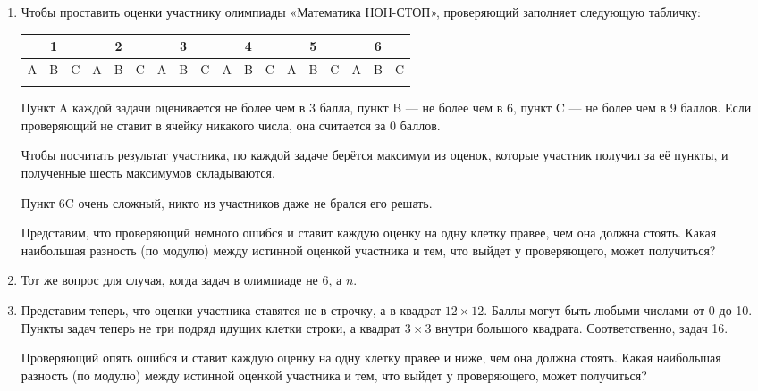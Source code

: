 \documentclass[a4paper,11pt]{article}
\newcommand{\smco}[1]{\multicolumn{3}{c|}{#1}}
\newcommand{\ismco}[1]{\multicolumn{3}{|c|}{#1}}
\begin{document}
\begin{enumerate}
\item Чтобы проставить оценки участнику олимпиады «Математика НОН-СТОП», проверяющий заполняет следующую табличку:

\begin{center} \begin{tabular}{|c|c|c|c|c|c|c|c|c|c|c|c|c|c|c|c|c|c|}
   \hline
   \ismco{1} & \smco{2} & \smco{3} & \smco{4} & \smco{5} & \smco{6} \\
   \hline
   A & B & C & A & B & C & A & B & C & A & B & C & A & B & C & A & B & C \\
   \hline
    & & & & & & & & & & & & & & & & & \\
   \hline
\end{tabular} \end{center}

Пункт A каждой задачи оценивается не более чем в 3 балла, пункт B — не более чем в 6, пункт C — не более чем в 9 баллов. Если проверяющий не ставит в ячейку никакого числа, она считается за 0 баллов.

Чтобы посчитать результат участника, по каждой задаче берётся максимум из оценок, которые участник получил за её пункты, и полученные шесть максимумов складываются.

Пункт 6C очень сложный, никто из участников даже не брался его решать.

Представим, что проверяющий немного ошибся и ставит каждую оценку на одну клетку правее, чем она должна стоять. Какая наибольшая разность (по модулю) между истинной оценкой участника и тем, что выйдет у проверяющего, может получиться?

\item Тот же вопрос для случая, когда задач в олимпиаде не 6, а $n$.

\item Представим теперь, что оценки участника ставятся не в строчку, а в квадрат \( 12 \times 12 \). Баллы могут быть любыми числами от 0 до 10. Пункты задач теперь не три подряд идущих клетки строки, а квадрат \( 3 \times 3 \) внутри большого квадрата. Соответственно, задач 16.

\begin{center}  \end{center}

Проверяющий опять ошибся и ставит каждую оценку на одну клетку правее и ниже, чем она должна стоять. Какая наибольшая разность (по модулю) между истинной оценкой участника и тем, что выйдет у проверяющего, может получиться?

\end{enumerate}
\end{document}
